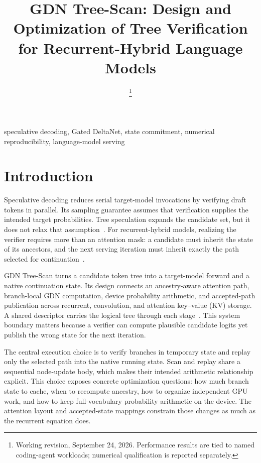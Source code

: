 \documentclass[conference]{IEEEtran}
\newcommand{\sys}{GDN Tree-Scan}
\begin{document}
\title{GDN Tree-Scan: Design and Optimization of Tree Verification for Recurrent-Hybrid Language Models}
\author{
\thanks{Working revision, September 24, 2026. Performance results are tied to named coding-agent workloads; numerical qualification is reported separately.}}
\maketitle

\begin{IEEEkeywords}
speculative decoding, Gated DeltaNet, state commitment, numerical reproducibility, language-model serving
\end{IEEEkeywords}

\section{Introduction}
Speculative decoding reduces serial target-model invocations by verifying draft tokens in parallel. Its sampling guarantee assumes that verification supplies the intended target probabilities. Tree speculation expands the candidate set, but it does not relax that assumption~\cite{leviathan2023fast,chen2023sampling,miao2023specinfer}. For recurrent-hybrid models, realizing the verifier requires more than an attention mask: a candidate must inherit the state of its ancestors, and the next serving iteration must inherit exactly the path selected for continuation~\cite{yang2024gated,wu2025stree}.

\sys{} turns a candidate token tree into a target-model forward and a native continuation state. Its design connects an ancestry-aware attention path, branch-local GDN computation, device probability arithmetic, and accepted-path publication across recurrent, convolution, and attention key--value (KV) storage. A shared descriptor carries the logical tree through each stage~\cite{lumo2026archive,lumo2026stateless}. This system boundary matters because a verifier can compute plausible candidate logits yet publish the wrong state for the next iteration.

The central execution choice is to verify branches in temporary state and replay only the selected path into the native running state. Scan and replay share a sequential node-update body, which makes their intended arithmetic relationship explicit. This choice exposes concrete optimization questions: how much branch state to cache, when to recompute ancestry, how to organize independent GPU work, and how to keep full-vocabulary probability arithmetic on the device. The attention layout and accepted-state mappings constrain those changes as much as the recurrent equation does.
\end{document}

